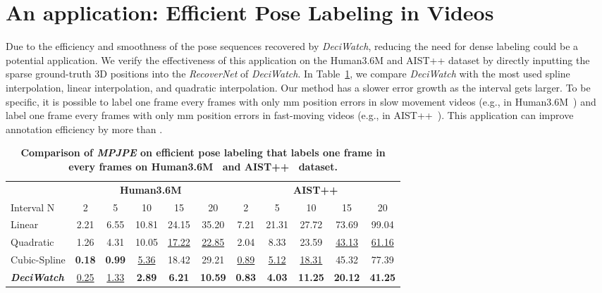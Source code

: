 \documentclass[runningheads]{llncs}
\newcommand{\name}{\emph{DeciWatch}\xspace}
\begin{document}
\section{An application: Efficient Pose Labeling in Videos}
\label{sec:supp_app}
Due to the efficiency and smoothness of the pose sequences recovered by \name, reducing the need for dense labeling could be a potential application. We verify the effectiveness of this application on the Human3.6M and AIST++ dataset by directly inputting the sparse ground-truth 3D positions into the \emph{RecoverNet} of \name. In Table~\ref{tab:label}, we compare \name with the most used spline interpolation, linear interpolation, and quadratic interpolation. Our method has a slower error growth as the interval  gets larger. 
To be specific, it is possible to label one frame every  frames with only mm position errors in slow movement videos (e.g., in Human3.6M~\cite{ionescu2013human3}) and label one frame every  frames with only mm position errors in fast-moving videos (e.g., in AIST++~\cite{li2021aist}). This application can improve annotation efficiency by more than .
\begin{table}[h]
\small
	\centering
    \caption{\textbf{Comparison of \emph{MPJPE} on efficient pose labeling that labels one frame in every  frames on Human3.6M~\cite{ionescu2013human3} and AIST++~\cite{li2021aist} dataset.}}
	{\begin{tabular}{l|ccccc||ccccc}

			\specialrule{.1em}{.05em}{.05em}
			&\multicolumn{5}{c||}{\cellcolor{Gray}\textbf{Human3.6M}}&\multicolumn{5}{c}{\cellcolor{Gray}\textbf{AIST++}}\\
			\cmidrule{2-11}
			Interval N&2 &  5 &10&15 &20&2 & 5 &10&15 &20\\
			\midrule
			Linear&2.21&6.55&10.81&24.15&35.20&7.21&21.31&27.72&73.69&99.04 \\
			Quadratic&1.26&4.31&10.05&\underline{17.22}&\underline{22.85}&2.04&8.33&23.59&\underline{43.13}&\underline{61.16}\\
			Cubic-Spline&\textbf{0.18}&\textbf{0.99}&\underline{5.36}&18.42&29.21&\underline{0.89}&\underline{5.12}&\underline{18.31}&45.32&77.39\\
		    \textbf{\name}& \underline{0.25}&\underline{1.33
		    }&\textbf{2.89}&\textbf{6.21}&\textbf{10.59}&\textbf{0.83}&\textbf{4.03}&\textbf{11.25}&\textbf{20.12}&\textbf{41.25}\\
        \midrule
        \end{tabular}}
	\label{tab:label}
\end{table}
\end{document}
